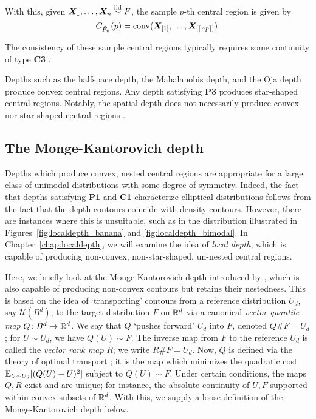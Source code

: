 With this, given $\bm{X}_1, \dots, \bm{X}_n \overset{\text{iid}}{\sim} F$, the sample $p$-th central
region is given by
\begin{equation}
    C_{\hat{F}_n}(p) = \operatorname{conv}(\bm{X}_{[1]}, \dots, \bm{X}_{[\lceil np \rceil]}).
\end{equation}

The consistency of these sample central regions typically requires some
continuity of type \textbf{C3} \parencite{liu-1990, donoho-gasko-1992,
he-wang-1997}.

Depths such as the halfspace depth, the Mahalanobis depth, and the Oja depth
produce convex central regions.
Any depth satisfying \textbf{P3} produces star-shaped central regions.
Notably, the spatial depth does not necessarily produce convex nor star-shaped
central regions \parencite{nagy-2017}.


\subsection{The Monge-Kantorovich depth}

Depths which produce convex, nested central regions are appropriate for a
large class of unimodal distributions with some degree of symmetry.
Indeed, the fact that depths satisfying \textbf{P1} and \textbf{C1}
characterize elliptical distributions follows from the fact that the depth
contours coincide with density contours.
However, there are instances where this is unsuitable, such as in the
distribution illustrated in Figures~\ref{fig:localdepth_banana} and
\ref{fig:localdepth_bimodal}.
In Chapter~\ref{chap:localdepth}, we will examine the idea of \emph{local
depth}, which is capable of producing non-convex, non-star-shaped, un-nested
central regions.

Here, we briefly look at the Monge-Kantorovich depth introduced by
\textcite{chernozhukov-galichon-hallin-henry-2017}, which is also capable of
producing non-convex contours but retains their nestedness.
This is based on the idea of `transporting' contours from a reference
distribution $U_d$, say $\mathcal{U}(B^d)$, to the target distribution $F$ on
$\mathbb{R}^d$ via a canonical \emph{vector quantile map} $Q\colon B^d \to \mathbb{R}^d$.
We say that $Q$ `pushes forward' $U_d$ into $F$, denoted $Q\#F = U_d$; for $U
\sim U_d$, we have $Q(U) \sim F$.
The inverse map from $F$ to the reference $U_d$ is called the \emph{vector
rank map} $R$; we write $R\#F = U_d$.
Now, $Q$ is defined via the theory of optimal transport
\parencite{villani-2003}; it is the map which minimizes the quadratic cost
$\operatorname{\mathbb{E}}_{U \sim U_d}[(Q(U) - U)^2]$ subject to $Q(U) \sim F$.
Under certain conditions, the maps $Q, R$ exist and are unique; for instance,
the absolute continuity of $U, F$ supported within convex subsets of $\mathbb{R}^d$.
With this, we supply a loose definition of the Monge-Kantorovich depth below.

